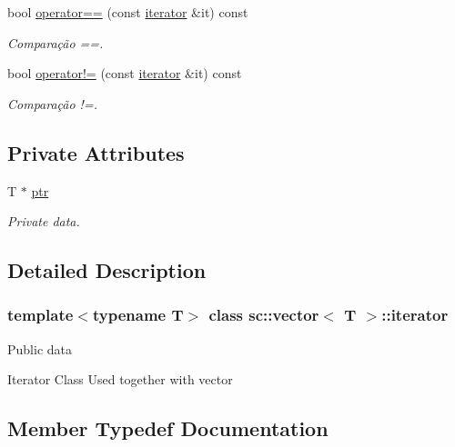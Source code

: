 \begin{DoxyCompactItemize}
bool \hyperlink{classsc_1_1vector_1_1iterator_ab635a96af6c0bcc3fe888e2568287df1}{operator==} (const \hyperlink{classsc_1_1vector_1_1iterator}{iterator} \&it) const
\begin{DoxyCompactList}\small\item\em Comparação ==. \end{DoxyCompactList}\item 
bool \hyperlink{classsc_1_1vector_1_1iterator_ae0f420848b61b2f1bd5c7dc414082d29}{operator!=} (const \hyperlink{classsc_1_1vector_1_1iterator}{iterator} \&it) const
\begin{DoxyCompactList}\small\item\em Comparação !=. \end{DoxyCompactList}\end{DoxyCompactItemize}
\subsection*{Private Attributes}
\begin{DoxyCompactItemize}
\item 
T $\ast$ \hyperlink{classsc_1_1vector_1_1iterator_a8f6a0c77f66fe2331b1837b341c08dc5}{ptr}
\begin{DoxyCompactList}\small\item\em Private data. \end{DoxyCompactList}\end{DoxyCompactItemize}


\subsection{Detailed Description}
\subsubsection*{template$<$typename T$>$\newline
class sc\+::vector$<$ T $>$\+::iterator}

Public data

Iterator Class Used together with vector 

\subsection{Member Typedef Documentation}
\mbox{\label{classsc_1_1vector_1_1iterator_a7089358e9f654206713ecd3951ac3545}} 
